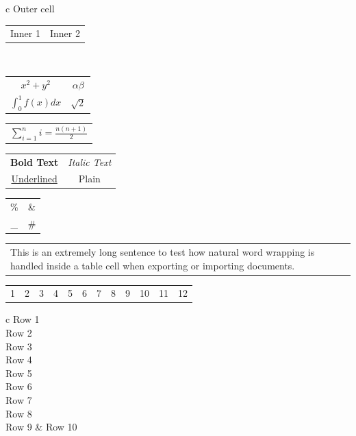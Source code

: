\documentclass{article}
\begin{document}
\begin{tabular}{c}
  Outer cell \\
  \begin{tabular}{cc}
    Inner 1 & Inner 2 \\
  \end{tabular} \\
\end{tabular}

\begin{tabular}{cc}
  $x^2 + y^2$ & $\alpha \beta$ \\
  $\int_0^1 f(x) dx$ & $\sqrt{2}$ \\
\end{tabular}

\begin{tabular}{c}
  $\displaystyle \sum_{i=1}^{n} i = \frac{n(n+1)}{2}$ \\
\end{tabular}

\begin{tabular}{cc}
  \textbf{Bold Text} & \textit{Italic Text} \\
  \underline{Underlined} & Plain \\
\end{tabular}

\begin{tabular}{cc}
  \% & \& \\
  \_ & \# \\
\end{tabular}

\begin{tabular}{p{5cm}}
  This is an extremely long sentence to test how natural word wrapping is handled inside a table cell when exporting or importing documents. \\
\end{tabular}

\begin{tabular}{cccccccccccc}
  1 & 2 & 3 & 4 & 5 & 6 & 7 & 8 & 9 & 10 & 11 & 12 \\
\end{tabular}

\begin{tabular}{c}
  Row 1 \\
  Row 2 \\
  Row 3 \\
  Row 4 \\
  Row 5 \\
  Row 6 \\
  Row 7 \\
  Row 8 \\
  Row 9 & Row 10 \\
\end{tabular}
\end{document}
